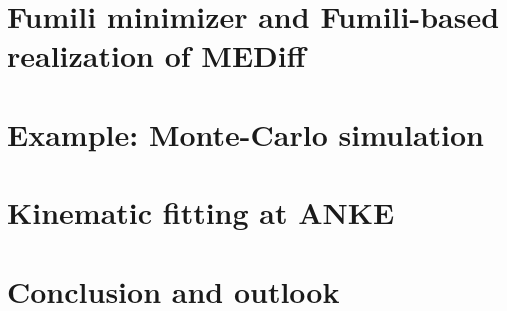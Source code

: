 \documentclass{webofc}
\begin{document}
\section{Fumili minimizer and Fumili-based realization of MEDiff}

 
\section{Example: Monte-Carlo simulation}

\section{Kinematic fitting at ANKE}

\section{Conclusion and outlook}

\end{document}
